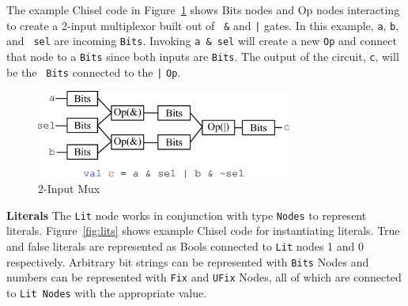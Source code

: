 The example Chisel code in Figure~\ref{fig:mux} shows Bits nodes and
Op nodes interacting to create a 2-input multiplexor built out of {\tt
\&} and {\tt |} gates. In this example,  {\tt a}, {\tt b}, and {\tt
 sel} are incoming {\tt Bits}. Invoking {\tt a \& sel} will create a
new {\tt Op} and connect that node to a {\tt Bits} since both inputs
are {\tt Bits}. The output of the circuit, {\tt c}, will be the {\tt
Bits} connected to the {\tt |} {\tt Op}. 

\begin{figure}[t]
\centering
\includegraphics[width=0.75\textwidth]{figures/mux.pdf}
\caption{2-Input Mux}
\label{fig:mux}
\end{figure}

{\bf Literals} The {\tt Lit} node works in conjunction with type {\tt Nodes} to
represent literals. Figure~\ref{fig:lits} shows example Chisel code for
instantiating literals. True and false literals are represented as Bools
connected to {\tt Lit} nodes 1 and 0 respectively. Arbitrary bit
strings can be represented with {\tt Bits} Nodes and numbers can be represented with
{\tt Fix} and {\tt UFix} Nodes, all of which are connected to {\tt Lit
Nodes} with the appropriate value.

